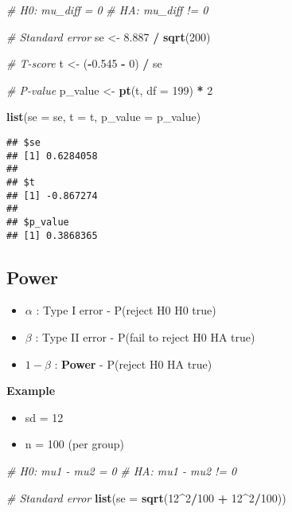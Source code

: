 \documentclass[]{book}
\newenvironment{Shaded}{\begin{snugshade}}{\end{snugshade}}
\newcommand{\CommentTok}[1]{\textcolor[rgb]{0.56,0.35,0.01}{\textit{#1}}}
\newcommand{\DataTypeTok}[1]{\textcolor[rgb]{0.13,0.29,0.53}{#1}}
\newcommand{\DecValTok}[1]{\textcolor[rgb]{0.00,0.00,0.81}{#1}}
\newcommand{\FloatTok}[1]{\textcolor[rgb]{0.00,0.00,0.81}{#1}}
\newcommand{\KeywordTok}[1]{\textcolor[rgb]{0.13,0.29,0.53}{\textbf{#1}}}
\newcommand{\NormalTok}[1]{#1}
\newcommand{\OperatorTok}[1]{\textcolor[rgb]{0.81,0.36,0.00}{\textbf{#1}}}
\newcommand{\StringTok}[1]{\textcolor[rgb]{0.31,0.60,0.02}{#1}}
\providecommand{\tightlist}{%
  \setlength{\itemsep}{0pt}\setlength{\parskip}{0pt}}
\begin{document}
\begin{Shaded}
\begin{Highlighting}[]
\CommentTok{# H0: mu_diff = 0}
\CommentTok{# HA: mu_diff != 0}

\CommentTok{# Standard error}
\NormalTok{se <-}\StringTok{ }\FloatTok{8.887} \OperatorTok{/}\StringTok{ }\KeywordTok{sqrt}\NormalTok{(}\DecValTok{200}\NormalTok{)}

\CommentTok{# T-score}
\NormalTok{t <-}\StringTok{ }\NormalTok{(}\OperatorTok{-}\FloatTok{0.545} \OperatorTok{-}\StringTok{ }\DecValTok{0}\NormalTok{) }\OperatorTok{/}\StringTok{ }\NormalTok{se}

\CommentTok{# P-value}
\NormalTok{p_value <-}\StringTok{ }\KeywordTok{pt}\NormalTok{(t, }\DataTypeTok{df =} \DecValTok{199}\NormalTok{) }\OperatorTok{*}\StringTok{ }\DecValTok{2}

\KeywordTok{list}\NormalTok{(}\DataTypeTok{se =}\NormalTok{ se, }\DataTypeTok{t =}\NormalTok{ t, }\DataTypeTok{p_value =}\NormalTok{ p_value)}
\end{Highlighting}
\end{Shaded}

\begin{verbatim}
## $se
## [1] 0.6284058
## 
## $t
## [1] -0.867274
## 
## $p_value
## [1] 0.3868365
\end{verbatim}

\hypertarget{power}{%
\subsection*{Power}\label{power}}

\begin{itemize}
\tightlist
\item
  \(\alpha\) : Type I error - P(reject H0 \textbar{} H0 true)
\item
  \(\beta\) : Type II error - P(fail to reject H0 \textbar{} HA true)
\item
  \(1 - \beta\) : \textbf{Power} - P(reject H0 \textbar{} HA true)
\end{itemize}

\textbf{Example}

\begin{itemize}
\tightlist
\item
  sd = 12
\item
  n = 100 (per group)
\end{itemize}

\begin{Shaded}
\begin{Highlighting}[]
\CommentTok{# H0: mu1 - mu2 = 0}
\CommentTok{# HA: mu1 - mu2 != 0}

\CommentTok{# Standard error}
\KeywordTok{list}\NormalTok{(}\DataTypeTok{se =} \KeywordTok{sqrt}\NormalTok{(}\DecValTok{12}\OperatorTok{^}\DecValTok{2}\OperatorTok{/}\DecValTok{100} \OperatorTok{+}\StringTok{ }\DecValTok{12}\OperatorTok{^}\DecValTok{2}\OperatorTok{/}\DecValTok{100}\NormalTok{))}
\end{Highlighting}
\end{Shaded}
\end{document}
